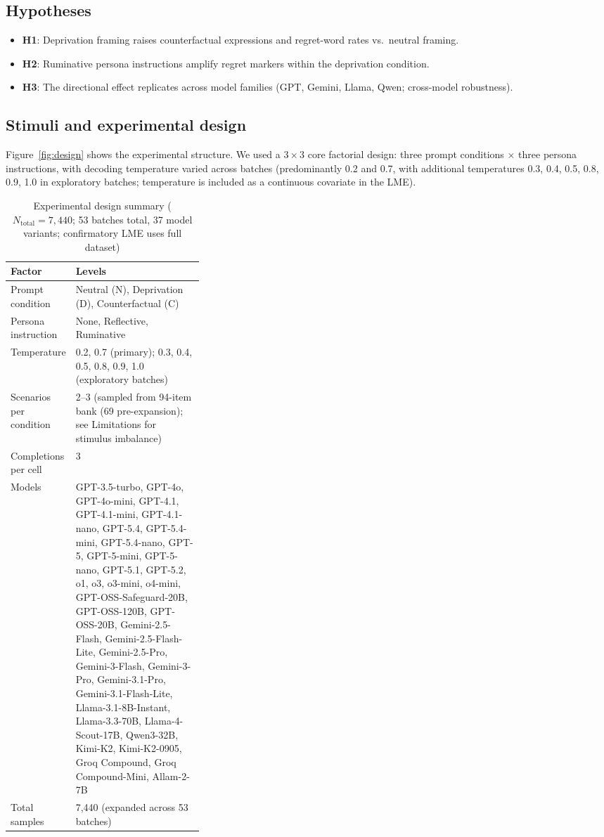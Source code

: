 \documentclass[11pt]{article}
\begin{document}
\subsection{Hypotheses}
\begin{itemize}
  \item \textbf{H1}: Deprivation framing raises counterfactual expressions and regret-word rates vs.\ neutral framing.
  \item \textbf{H2}: Ruminative persona instructions amplify regret markers within the deprivation condition.
  \item \textbf{H3}: The directional effect replicates across model families (GPT, Gemini, Llama, Qwen; cross-model robustness).
\end{itemize}

\subsection{Stimuli and experimental design}
Figure~\ref{fig:design} shows the experimental structure.
We used a $3\times3$ core factorial design: three prompt conditions $\times$ three persona instructions, with decoding temperature varied across batches (predominantly 0.2 and 0.7, with additional temperatures 0.3, 0.4, 0.5, 0.8, 0.9, 1.0 in exploratory batches; temperature is included as a continuous covariate in the LME).

\begin{table}[t]
\caption{Experimental design summary ($N_\text{total}=7{,}440$; 53 batches total, 37 model variants; confirmatory LME uses full dataset)}
\label{tab:design}
\footnotesize\centering
\begin{tabularx}{\linewidth}{>{\RaggedRight\arraybackslash}p{0.32\linewidth}X}
\toprule
\rowcolor{tableheader}
\textbf{Factor} & \textbf{Levels} \\
\midrule
Prompt condition & Neutral (N), Deprivation (D), Counterfactual (C) \\
Persona instruction & None, Reflective, Ruminative \\
Temperature & 0.2, 0.7 (primary); 0.3, 0.4, 0.5, 0.8, 0.9, 1.0 (exploratory batches) \\
Scenarios per condition & 2--3 (sampled from 94-item bank (69 pre-expansion); see Limitations for stimulus imbalance) \\
Completions per cell & 3 \\
Models & GPT-3.5-turbo, GPT-4o, GPT-4o-mini, GPT-4.1, GPT-4.1-mini, GPT-4.1-nano, GPT-5.4, GPT-5.4-mini, GPT-5.4-nano, GPT-5, GPT-5-mini, GPT-5-nano, GPT-5.1, GPT-5.2, o1, o3, o3-mini, o4-mini, GPT-OSS-Safeguard-20B, GPT-OSS-120B, GPT-OSS-20B, Gemini-2.5-Flash, Gemini-2.5-Flash-Lite, Gemini-2.5-Pro, Gemini-3-Flash, Gemini-3-Pro, Gemini-3.1-Pro, Gemini-3.1-Flash-Lite, Llama-3.1-8B-Instant, Llama-3.3-70B, Llama-4-Scout-17B, Qwen3-32B, Kimi-K2, Kimi-K2-0905, Groq Compound, Groq Compound-Mini, Allam-2-7B \\
Total samples & 7{,}440 (expanded across 53 batches) \\
\bottomrule
\end{tabularx}
\end{table}
\end{document}
